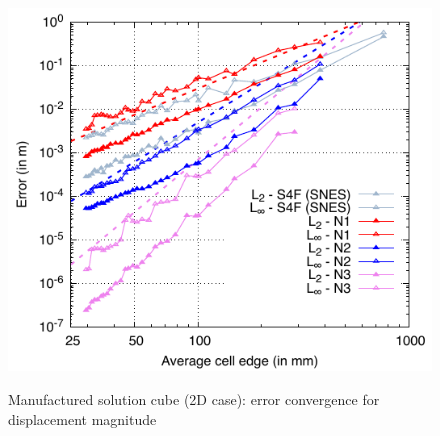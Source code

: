 \documentclass[sn-mathphys,Numbered]{sn-jnl}%
\begin{document}
\begin{figure}[H]
{    		\includegraphics[scale=0.8]{figures/mms/2D/mms_dispErrors_ho-tet-unstruct}  
    }
 	\caption{Manufactured solution cube (2D case): error convergence for displacement magnitude}
 	\label{fig:xx}
 \end{figure}
 
\end{document}
